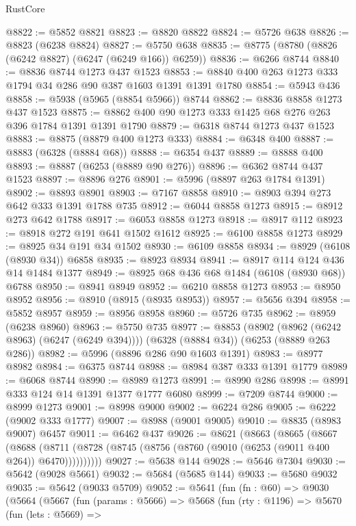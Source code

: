 \begin{lexlean}{RustCore}
\begin{coremodule}
@8822 := @5852 @8821
@8823 := @8820 @8822
@8824 := @5726 @638
@8826 := @8823 (@6238 @8824)
@8827 := @5750 @638
@8835 := @8775 (@8780 (@8826 (@6242 @8827) (@6247 (@6249 @166)) @6259))
@8836 := @6266 @8744
@8840 := @8836 @8744 @1273 @437 @1523
@8853 := @8840 @400 @263 @1273 @333 @1794 @34 @286 @90 @387 @1603 @1391 @1391 @1780
@8854 := @5943 @436
@8858 := @5938 (@5965 (@8854 @5966)) @8744
@8862 := @8836 @8858 @1273 @437 @1523
@8875 := @8862 @400 @90 @1273 @333 @1425 @68 @276 @263 @396 @1784 @1391 @1391 @1790
@8879 := @6318 @8744 @1273 @437 @1523
@8883 := @8875 (@8879 @400 @1273 @333)
@8884 := @6348 @400
@8887 := @8883 (@6328 (@8884 @68))
@8888 := @6354 @437
@8889 := @8888 @400
@8893 := @8887 (@6253 (@8889 @90 @276))
@8896 := @6362 @8744 @437 @1523
@8897 := @8896 @276
@8901 := @5996 (@8897 @263 @1784 @1391)
@8902 := @8893 @8901
@8903 := @7167 @8858
@8910 := @8903 @394 @273 @642 @333 @1391 @1788 @735
@8912 := @6044 @8858 @1273
@8915 := @8912 @273 @642 @1788
@8917 := @6053 @8858 @1273
@8918 := @8917 @112
@8923 := @8918 @272 @191 @641 @1502 @1612
@8925 := @6100 @8858 @1273
@8929 := @8925 @34 @191 @34 @1502
@8930 := @6109 @8858
@8934 := @8929 (@6108 (@8930 @34)) @6858
@8935 := @8923 @8934
@8941 := @8917 @114 @124 @436 @14 @1484 @1377
@8949 := @8925 @68 @436 @68 @1484 (@6108 (@8930 @68)) @6788
@8950 := @8941 @8949
@8952 := @6210 @8858 @1273
@8953 := @8950 @8952
@8956 := @8910 (@8915 (@8935 @8953))
@8957 := @5656 @394
@8958 := @5852 @8957
@8959 := @8956 @8958
@8960 := @5726 @735
@8962 := @8959 (@6238 @8960)
@8963 := @5750 @735
@8977 := @8853
    (@8902 (@8962 (@6242 @8963) (@6247 (@6249 @394))))
    (@6328 (@8884 @34))
    (@6253 (@8889 @263 @286))
@8982 := @5996 (@8896 @286 @90 @1603 @1391)
@8983 := @8977 @8982
@8984 := @6375 @8744
@8988 := @8984 @387 @333 @1391 @1779
@8989 := @6068 @8744
@8990 := @8989 @1273
@8991 := @8990 @286
@8998 := @8991 @333 @124 @14 @1391 @1377 @1777 @6080
@8999 := @7209 @8744
@9000 := @8999 @1273
@9001 := @8998 @9000
@9002 := @6224 @286
@9005 := @6222 (@9002 @333 @1777)
@9007 := @8988 (@9001 @9005)
@9010 := @8835 (@8983 @9007) @6457
@9011 := @6462 @437
@9026 := @8621
    (@8663
      (@8665
        (@8667
          (@8688 (@8711 (@8728 (@8745 (@8756 (@8760 (@9010 (@6253 (@9011 @400 @264)) @6470))))))))))
@9027 := @5638 @144
@9028 := @5646 @7304
@9030 := @5642 (@9028 @5661)
@9032 := @5684 (@5685 @144)
@9033 := @5680 @9032
@9035 := @5642 (@9033 @5709)
@9052 := @5641
    (fun (fn : @60) =>
    @9030
      (@5664
        (@5667
          (fun (params : @5666) =>
          @5668
            (fun (rty : @1196) =>
            @5670
              (fun (lets : @5669) =>

\end{coremodule}
\end{lexlean}
